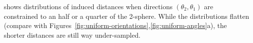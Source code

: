 
 shows distributions of induced distances when directions $(\theta_2, \theta_1)$ are constrained to an half or a quarter of the 2-sphere.
While the distributions flatten (compare with Figures~\ref{fig:uniform-orientations},\ref{fig:uniform-angles}a), the shorter distances are still way under-sampled.

